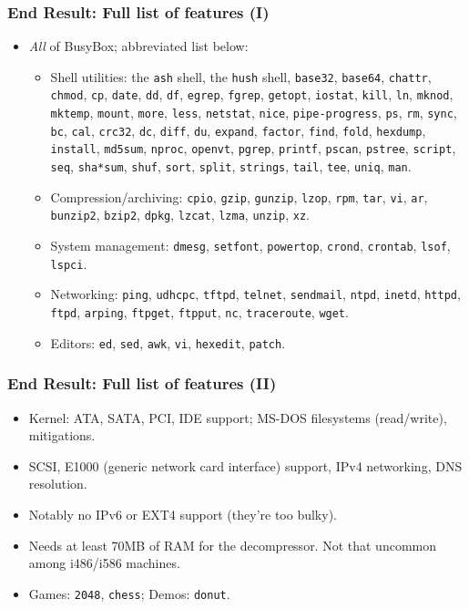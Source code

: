 \documentclass{beamer}
\begin{document}
\begin{frame}[t,fragile]
\frametitle{End Result: Full list of features (I)}
  \begin{itemize}
    \item \textit{All} of BusyBox; abbreviated list below:
    \begin{itemize}
      \item Shell utilities: the \verb|ash| shell, the \verb|hush| shell, \verb|base32|, \verb|base64|, \verb|chattr|, \verb|chmod|, \verb|cp|, \verb|date|, \verb|dd|, \verb|df|, \verb|egrep|, \verb|fgrep|, \verb|getopt|, \verb|iostat|, \verb|kill|, \verb|ln|, \verb|mknod|, \verb|mktemp|, \verb|mount|, \verb|more|, \verb|less|, \verb|netstat|, \verb|nice|, \verb|pipe-progress|, \verb|ps|, \verb|rm|, \verb|sync|, \verb|bc|, \verb|cal|, \verb|crc32|, \verb|dc|, \verb|diff|, \verb|du|, \verb|expand|, \verb|factor|, \verb|find|, \verb|fold|, \verb|hexdump|, \verb|install|, \verb|md5sum|, \verb|nproc|, \verb|openvt|, \verb|pgrep|, \verb|printf|, \verb|pscan|, \verb|pstree|, \verb|script|, \verb|seq|, \verb|sha*sum|, \verb|shuf|, \verb|sort|, \verb|split|, \verb|strings|, \verb|tail|, \verb|tee|, \verb|uniq|, \verb|man|.
      \item Compression/archiving: \verb|cpio|, \verb|gzip|, \verb|gunzip|, \verb|lzop|, \verb|rpm|, \verb|tar|, \verb|vi|, \verb|ar|, \verb|bunzip2|, \verb|bzip2|, \verb|dpkg|, \verb|lzcat|, \verb|lzma|, \verb|unzip|, \verb|xz|.
      \item System management: \verb|dmesg|, \verb|setfont|, \verb|powertop|, \verb|crond|, \verb|crontab|, \verb|lsof|, \verb|lspci|.
      \item Networking: \verb|ping|, \verb|udhcpc|, \verb|tftpd|, \verb|telnet|, \verb|sendmail|, \verb|ntpd|, \verb|inetd|, \verb|httpd|, \verb|ftpd|, \verb|arping|, \verb|ftpget|, \verb|ftpput|, \verb|nc|, \verb|traceroute|, \verb|wget|.
      \item Editors: \verb|ed|, \verb|sed|, \verb|awk|, \verb|vi|, \verb|hexedit|, \verb|patch|.
    \end{itemize}
  \end{itemize}
\end{frame}

\begin{frame}[t,fragile]
\frametitle{End Result: Full list of features (II)}
  \begin{itemize}
    \item Kernel: ATA, SATA, PCI, IDE support; MS-DOS filesystems (read/write), mitigations.
    \item SCSI, E1000 (generic network card interface) support, IPv4 networking, DNS resolution.
    \item Notably no IPv6 or EXT4 support (they're too bulky).
    \item Needs at least 70MB of RAM for the decompressor. Not that uncommon among i486/i586 machines.
    \item Games: \verb|2048|, \verb|chess|; Demos: \verb|donut|. 
  \end{itemize}
\end{frame}
\end{document}
